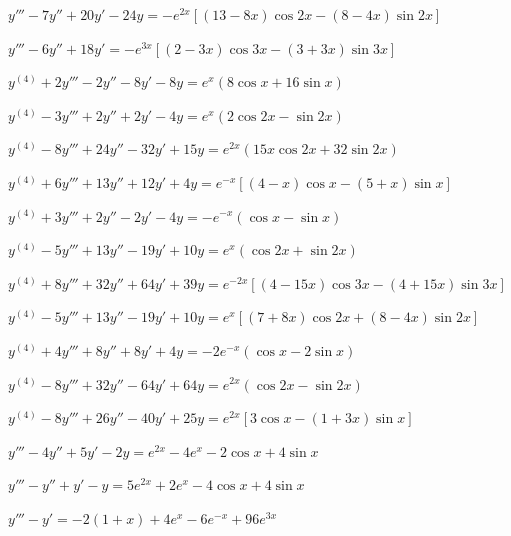 \begin{exerciselist}
  \item\label{exer:9.3.35} $y'''-7y''+20y'-24y=-e^{2x}[(13-8x)\cos 2x-(8-4x)\sin2x]$

  \item\label{exer:9.3.36} $y'''-6y''+18y'=-e^{3x}[(2-3x)\cos 3x-(3+3x)\sin3x]$

  \item\label{exer:9.3.37} $y^{(4)}+2y'''-2y''-8y'-8y=e^{x}(8\cos x+16\sin x)$

  \item\label{exer:9.3.38} $y^{(4)}-3y'''+2y''+2y'-4y=e^{x}(2\cos2x -\sin2x)$

  \item\label{exer:9.3.39} $y^{(4)}-8y'''+24y''-32y'+15y=e^{2x}(15x\cos2x+32\sin2x)$

  \item\label{exer:9.3.40} $y^{(4)}+6y'''+13y''+12y'+4y=e^{-x}[(4-x)\cos x-(5+x)\sin x]$

  \item\label{exer:9.3.41} $y^{(4)}+3y'''+2y''-2y'-4y=-e^{-x}(\cos x-\sin x)$

  \item\label{exer:9.3.42} $y^{(4)}-5y'''+13y''-19y'+10y=e^{x}(\cos2x+\sin2x)$

  \item\label{exer:9.3.43} $y^{(4)}+8y'''+32y''+64y'+39y=e^{-2x}[(4-15x)\cos3x-(4+15x)\sin 3x]$

  \item\label{exer:9.3.44} $y^{(4)}-5y'''+13y''-19y'+10y=e^{x}[(7+8x)\cos 2x+(8-4x)\sin2x]$

  \item\label{exer:9.3.45} $y^{(4)}+4y'''+8y''+8y'+4y=-2e^{-x}(\cos x-2\sin x)$

  \item\label{exer:9.3.46} $y^{(4)}-8y'''+32y''-64y'+64y=e^{2x}(\cos2x-\sin2x)$

  \item\label{exer:9.3.47} $y^{(4)}-8y'''+26y''-40y'+25y=e^{2x}[3\cos x-(1+3x)\sin x]$

  \item\label{exer:9.3.48} $y'''-4y''+5y'-2y=e^{2x}-4e^{x}-2\cos x+4\sin x$

  \item\label{exer:9.3.49} $y'''-y''+y'-y=5e^{2x}+2e^{x}-4\cos x+4\sin x$

  \item\label{exer:9.3.50} $y'''-y'=-2(1+x)+4e^{x}-6e^{-x}+96e^{3x}$


\end{exerciselist}

